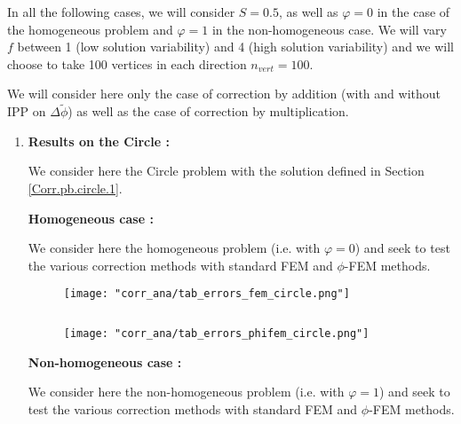 In all the following cases, we will consider $S=0.5$, as well as $\varphi=0$ in the case of the homogeneous problem and $\varphi=1$ in the non-homogeneous case. We will vary $f$ between 1 (low solution variability) and 4 (high solution variability) and we will choose to take 100 vertices in each direction $n_{vert}=100$.

\begin{Rem}
	We will consider here only the case of correction by addition (with and without IPP on $\Delta\tilde{\phi}$) as well as the case of correction by multiplication.
\end{Rem}

\begin{enumerate}[label=\textbullet]
	\item \textbf{Results on the Circle :}
	
	We consider here the Circle problem with the solution defined in Section \ref{Corr.pb.circle.1}.
	
	\textbf{Homogeneous case :}
	
	We consider here the homogeneous problem (i.e. with $\varphi=0$) and seek to test the various correction methods with standard FEM and $\phi$-FEM methods.
	
	\begin{minipage}{0.48\linewidth}
		\begin{figure}[H]
			\centering
			\texttt{[image: "corr\_ana/tab\_errors\_fem\_circle.png"]}
			\label{tab_errors_fem_circle}
		\end{figure} 
	\end{minipage} $\qquad$
	\begin{minipage}{0.48\linewidth} \qquad 
		\begin{figure}[H]
			\centering
			\texttt{[image: "corr\_ana/tab\_errors\_phifem\_circle.png"]}
			\label{tab_errors_phifem_circle}
		\end{figure} 
	\end{minipage}
	
	\textbf{Non-homogeneous case :}
	
	We consider here the non-homogeneous problem (i.e. with $\varphi=1$) and seek to test the various correction methods with standard FEM and $\phi$-FEM methods.
	

\end{enumerate}
